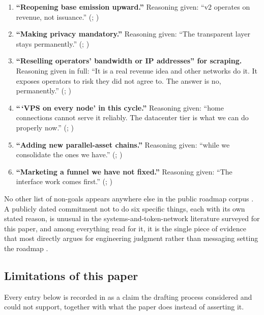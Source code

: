 \begin{enumerate}
\item \textbf{``Reopening base emission upward.''} Reasoning given: ``\PNR v2 operates on revenue,
  not issuance.'' (\planned; )
\item \textbf{``Making privacy mandatory.''} Reasoning given: ``The transparent layer stays
  permanently.'' (\planned; )
\item \textbf{``Reselling operators' bandwidth or IP addresses'' for scraping.} Reasoning given in
  full: ``It is a real revenue idea and other networks do it. It exposes operators to risk they did
  not agree to. The answer is no, permanently.'' (\planned;
  )
\item \textbf{``\,`VPS on every node' in this cycle.''} Reasoning given: ``home connections cannot
  serve it reliably. The datacenter tier is what we can do properly now.'' (\planned;
  )
\item \textbf{``Adding new parallel-asset chains.''} Reasoning given: ``while we consolidate the ones
  we have.'' (\planned; )
\item \textbf{``Marketing a funnel we have not fixed.''} Reasoning given: ``The interface work comes
  first.'' (\planned; )
\end{enumerate}

No other list of non-goals appears anywhere else in the public roadmap corpus
. A publicly
dated commitment not to do six specific things, each with its own stated reason, is unusual in the
systems-and-token-network literature surveyed for this paper, and among everything read for it, it is
the single piece of evidence that most directly argues for engineering judgment rather than messaging
setting the roadmap \srcinferred.

\subsection{Limitations of this paper}

Every entry below is recorded in  as a claim the drafting process considered and
could not support, together with what the paper does instead of asserting it.

